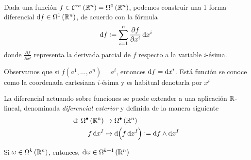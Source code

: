\begin{defi}
   Dada una función $f \in \mathcal{C}^\infty \left( \mathbb{R}^n \right) = \Omega^0 \left( \mathbb{R}^n \right)$, podemos construir una 1-forma diferencial
   $\dif f \in \Omega^1 \left( \real^n \right)$, de acuerdo con la fórmula
   \[
       \dif f := \sum^n_{i=1} \frac{\partial f}{\partial x^i} \dif x^i
   \]
   donde $\frac{\partial f}{\partial x^i}$ representa la derivada parcial de $f$ respecto a la variable $i$-\'esima.
\end{defi}

\begin{obs}
    Observamos que si $f \left( a^1, \dots, a^n \right) = a^i$, entonces $\dif f = \dif x^i$. Está función se conoce como la coordenada
    cartesiana $i$-\'esima y es habitual denotarla por $x^i$
\end{obs}

\begin{defi}
    La diferencial actuando sobre funciones se puede extender a una aplicación $\mathbb{R}$-lineal, denominada \emph{diferencial exterior} y definida
    de la manera siguiente
        \begin{align*}
            \dif \colon \Omega^\bullet \left( \real^n \right) &\to \Omega^\bullet \left( \real^n \right) \\
            f \dif x^I &\mapsto \dif\left( f \dif x^I \right) := \dif f \wedge \dif x^I
        \end{align*}
\end{defi}

\begin{obs*}
    Si $\omega \in \Omega^k \left( \mathbb{R}^n \right)$, entonces, $\dif \omega \in \Omega^{k+1} \left( \real^n \right)$
\end{obs*}

